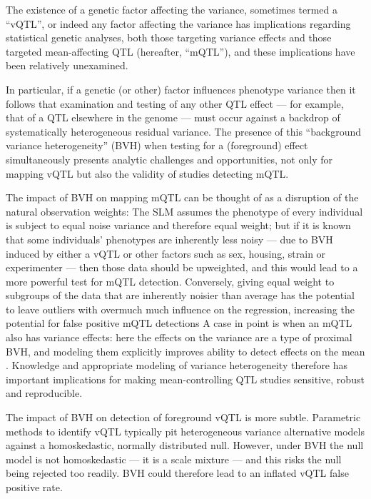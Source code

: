 The existence of a genetic factor affecting the variance, sometimes termed a ``vQTL'', or indeed any factor affecting the variance has implications regarding statistical genetic analyses, both those targeting variance effects and those targeted mean-affecting QTL (hereafter, ``mQTL''), and these implications have been relatively unexamined. 

In particular, if a genetic (or other) factor influences phenotype variance then it follows that examination and testing of any other QTL effect --- for example, that of a QTL elsewhere in the genome --- must occur against a backdrop of systematically heterogeneous residual variance.
The presence of this ``background variance heterogeneity'' (BVH) when testing for a (foreground) effect simultaneously presents analytic challenges and opportunities, not only for mapping vQTL but also the validity of studies detecting mQTL. 

The impact of BVH on mapping mQTL can be thought of as a disruption of the natural observation weights: The SLM assumes the phenotype of every individual is subject to equal noise variance and therefore equal weight; but if it is known that some individuals' phenotypes are inherently less noisy --- due to BVH induced by either a vQTL or other factors such as sex, housing, strain or experimenter --- then those data should be upweighted, and this would lead to a more powerful test for mQTL detection.
Conversely, giving equal weight to subgroups of the data that are inherently noisier than average has the potential to leave outliers with overmuch much influence on the regression, increasing the potential for false positive mQTL detections
A case in point is when an mQTL also has variance effects: here the effects on the variance are a type of proximal BVH, and modeling them explicitly improves ability to detect effects on the mean \CortyReanalysisPaper.
Knowledge and appropriate modeling of variance heterogeneity therefore has important implications for making mean-controlling QTL studies sensitive, robust and reproducible.

The impact of BVH on detection of foreground vQTL is more subtle. Parametric methods to identify vQTL typically pit heterogeneous variance alternative models against a homoskedastic, normally distributed null.
However, under BVH the null model is not homoskedastic --- it is a scale mixture --- and this risks the null being rejected too readily.
BVH could therefore lead to an inflated vQTL false positive rate.

